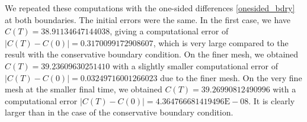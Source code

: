 We repeated these computations with the one-sided differences \eqref{onesided_bdry} at both boundaries. The initial errors were the same.
In the first case, we have $C(T)=38.91134647144038$, giving a computational error of $|C(T)-C(0)|=0.3170099172908607$, 
which is very large compared to the result with the conservative boundary condition.
On the finer mesh, we obtained $C(T)=39.23609630251410$ with a slightly
smaller computational error of $|C(T)-C(0)|= 0.03249716001266023$ due to the finer mesh. On the very fine mesh 
at the smaller final time, we obtained $C(T)=39.26990812490996$ with
a computational error $|C(T)-C(0)|=4.364766681419496\text{E}-08$. It is clearly larger than in the case of the conservative boundary condition.


